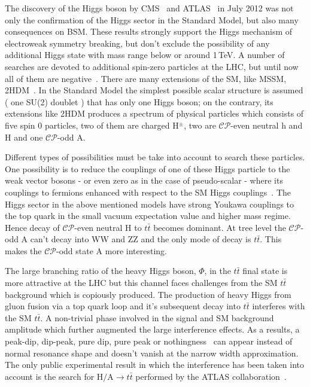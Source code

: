 The discovery of the Higgs boson by CMS~\cite{cms_sm_higgs} and ATLAS~\cite{atlas_sm_higgs} in July 2012 was not only the confirmation of the Higgs sector in the Standard Model, but also many consequences on BSM. These results strongly support the Higgs mechanism of electroweak symmetry breaking, but don't exclude the possibility of any additional Higgs state with mass range below or around 1\,TeV. A number of searches are devoted to additional spin-zero particles at the LHC, but until now all of them are negative~\cite{Bernreuther:2015fts}. There are many extensions of the SM, like MSSM, 2HDM~\cite{Branco:2011iw}. In the Standard Model the simplest possible scalar structure is assumed ( one SU(2) doublet ) that has only one Higgs boson; on the contrary, its extensions like 2HDM produces a spectrum of physical particles which consists of five spin 0 particles, two of them are charged H$^\pm$, two are $\mathcal{CP}$-even neutral h and H and one $\mathcal{CP}$-odd A. 

Different types of possibilities must be take into account to search these particles. One possibility is to reduce the couplings of one of these Higgs particle to the weak vector bosons - or even zero as in the case of pseudo-scalar - where its couplings to fermions enhanced with respect to the SM Higgs couplings~\cite{PhysRevD.58.114031}. The Higgs sector in the above mentioned models have strong Youkawa couplings to the top quark in the small vacuum expectation value and higher mass regime. Hence decay of $\mathcal{CP}$-even neutral H to $t\bar{t}$ becomes dominant. At tree level the $\mathcal{CP}$-odd A can't decay into WW and ZZ and the only mode of decay is $t\bar{t}$. This makes the $\mathcal{CP}$-odd state A more interesting.

The large branching ratio of the heavy Higgs boson, $\Phi$, in the $t\bar{t}$ final state is more attractive at the LHC but this channel faces challenges from the SM $t\bar t$ background which is copiously produced. The production of heavy Higgs from gluon fusion via a top quark loop and it's subsequent decay into $t\bar t$ interferes with the SM $t\bar t$. A non-trivial phase involved in the signal and SM background amplitude which further augmented the large interference effects. As a results, a peak-dip, dip-peak, pure dip, pure peak or nothingness~\cite{Jung:2015gta} can appear instead of normal resonance shape and doesn't vanish at the narrow width approximation. The only public experimental result in which the interference has been taken into account is the search for $\text{H} / \text{A} \rightarrow t \bar t$ performed by the ATLAS collaboration~\cite{Aaboud:2017hnm}.

